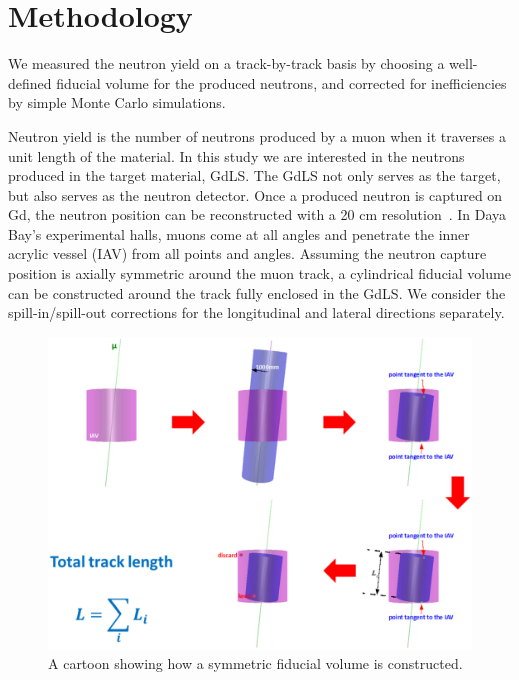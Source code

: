 \section{Methodology}
We measured the neutron yield on a track-by-track basis by choosing a well-defined fiducial volume for the produced neutrons, and corrected for inefficiencies by simple Monte Carlo simulations.

Neutron yield is the number of neutrons produced by a muon when it traverses a unit length of the material. In this study we are interested in the neutrons produced in the target material, GdLS. The GdLS not only serves as the target, but also serves as the neutron detector. Once a produced neutron is captured on Gd, the neutron position can be reconstructed with a 20 cm resolution~\cite{docdb7334}. In Daya Bay's experimental halls, muons come at all angles and penetrate the inner acrylic vessel (IAV) from all points and angles. Assuming the neutron capture position is axially symmetric around the muon track, a cylindrical fiducial volume can be constructed around the track fully enclosed in the GdLS. We consider the spill-in/spill-out corrections for the longitudinal and lateral directions separately.

\begin{figure}[ht]
	\centering
	\includegraphics[width=\textwidth]{figures/chap7/fiducial_illustration.eps}
	\caption{A cartoon showing how a symmetric fiducial volume is constructed.}
	\label{fig:fiducial_illustration}
\end{figure}

